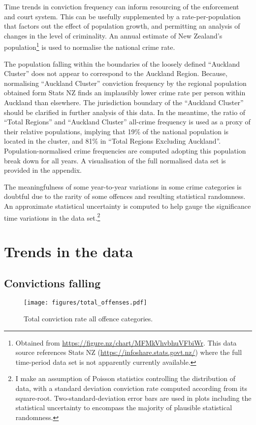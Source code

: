 \documentclass[onecolumn]{myarticle}
\begin{document}
Time trends in conviction frequency can inform resourcing of the enforcement and court system.
This can be usefully supplemented by a rate-per-population that factors out the effect of population growth, and permitting an analysis of changes in the level of criminality.
An annual estimate of New Zealand's population\footnote{Obtained from \url{https://figure.nz/chart/MFMkVhvbhuVFbiWr}. This data source references Stats NZ (\url{https://infoshare.stats.govt.nz/}) where the full time-period data set is not apparently currently available.}  is used to normalise the national crime rate.

The population falling within the boundaries of the loosely defined ``Auckland Cluster'' does not appear to correspond to the Auckland Region.
Because, normalising ``Auckland Cluster'' conviction frequency by the regional population obtained form Stats NZ finds an implausibly lower crime rate per person within Auckland than elsewhere.
The jurisdiction boundary of the ``Auckland Cluster'' should be clarified in further analysis of this data.
In the meantime, the ratio of ``Total Regions'' and ``Auckland Cluster'' all-crime frequency is used as a proxy of their relative populations, implying that 19\% of the national population is located in the cluster, and 81\% in ``Total Regions Excluding Auckland''.
Population-normalised crime frequencies are computed adopting this population break down for all years.
A visualisation of the full normalised data set is provided in the appendix.

The meaningfulness of some year-to-year variations in some crime categories is doubtful due to the rarity of some offences and resulting statistical randomness.
An approximate statistical uncertainty is computed to help gauge the significance time variations in the data set.\footnote{I make an assumption of Poisson statistics controlling the distribution of data, with a standard deviation conviction rate computed according from its square-root.  
Two-standard-deviation error bars are used in plots including the statistical uncertainty to encompass the majority of plausible statistical randomness.}

\section*{Trends in the data}

\subsection*{Convictions falling}
\begin{figure}
  \centering
  \texttt{[image: figures/total\_offenses.pdf]}
  \caption{Total conviction rate all offence categories.}
  \label{fig:total crime}
\end{figure}
\end{document}
